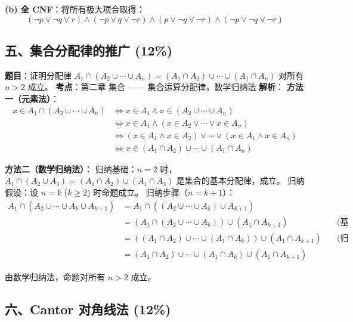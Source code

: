\documentclass[10pt,a4paper,openany]{ctexbook}
\theoremstyle{definition}
\theoremstyle{remark}
\begin{document}
\textbf{(b) 全 CNF}：将所有极大项合取得：
\[
(\neg p \lor \neg q \lor r) \land (\neg p \lor q \lor \neg r) \land (p \lor \neg q \lor \neg r) \land (\neg p \lor \neg q \lor \neg r)
\]

\vspace{-2pt}

\subsection{五、集合分配律的推广 (12\%)}

\textbf{题目}：证明分配律 $A_1 \cap (A_2 \cup \cdots \cup A_n) = (A_1 \cap A_2) \cup \cdots \cup (A_1 \cap A_n)$ 对所有 $n > 2$ 成立。
\textbf{考点}：第二章 集合 —— 集合运算分配律，数学归纳法
\textbf{解析}：
\textbf{方法一（元素法）}：
\[
\begin{aligned}
x \in A_1 \cap (A_2 \cup \cdots \cup A_n)
&\iff x \in A_1 \land x \in (A_2 \cup \cdots \cup A_n) \\
&\iff x \in A_1 \land (x \in A_2 \lor \cdots \lor x \in A_n) \\
&\iff (x \in A_1 \land x \in A_2) \lor \cdots \lor (x \in A_1 \land x \in A_n) \\
&\iff x \in (A_1 \cap A_2) \cup \cdots \cup (A_1 \cap A_n)
\end{aligned}
\]

\textbf{方法二（数学归纳法）}：
归纳基础：$n = 2$ 时，$A_1 \cap (A_2 \cup A_3) = (A_1 \cap A_2) \cup (A_1 \cap A_3)$ 是集合的基本分配律，成立。
归纳假设：设 $n = k$ ($k \ge 2$) 时命题成立。
归纳步骤（$n = k + 1$）：
\[
\begin{aligned}
A_1 \cap (A_2 \cup \cdots \cup A_k \cup A_{k+1})
&= A_1 \cap ((A_2 \cup \cdots \cup A_k) \cup A_{k+1}) \\
&= (A_1 \cap (A_2 \cup \cdots \cup A_k)) \cup (A_1 \cap A_{k+1}) \quad &\text{(基本分配律)}\\
&= ((A_1 \cap A_2) \cup \cdots \cup (A_1 \cap A_k)) \cup (A_1 \cap A_{k+1}) \quad &\text{(归纳假设)}\\
&= (A_1 \cap A_2) \cup \cdots \cup (A_1 \cap A_k) \cup (A_1 \cap A_{k+1})
\end{aligned}
\]

由数学归纳法，命题对所有 $n > 2$ 成立。
\vspace{-2pt}

\subsection{六、Cantor 对角线法 (12\%)}
\end{document}
